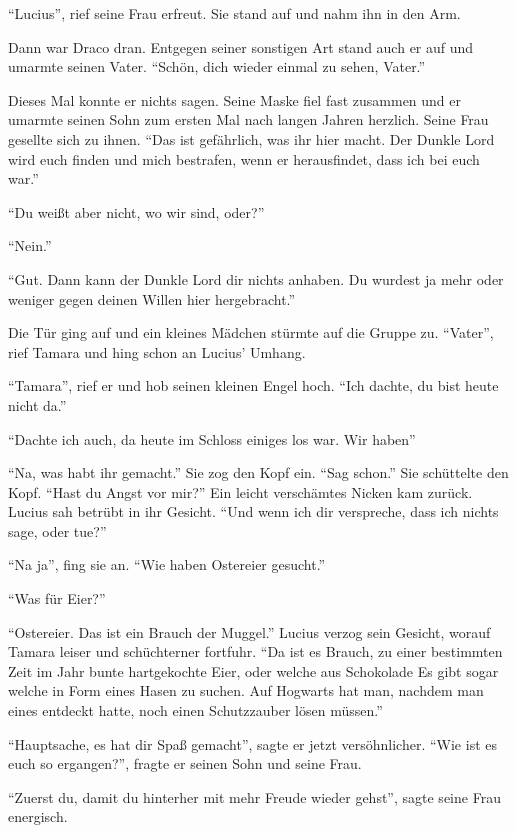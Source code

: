 \enquote{Lucius}, rief seine Frau erfreut. Sie stand auf und nahm ihn in den Arm.

Dann war Draco dran. Entgegen seiner sonstigen Art stand auch er auf und umarmte seinen Vater. \enquote{Schön, dich wieder einmal zu sehen, Vater.}

Dieses Mal konnte er nichts sagen. Seine Maske fiel fast zusammen und er umarmte seinen Sohn zum ersten Mal nach langen Jahren herzlich. Seine Frau gesellte sich zu ihnen. \enquote{Das ist gefährlich, was ihr hier macht. Der Dunkle Lord wird euch finden und mich bestrafen, wenn er herausfindet, dass ich bei euch war.}

\enquote{Du weißt aber nicht, wo wir sind, oder?}

\enquote{Nein.}

\enquote{Gut. Dann kann der Dunkle Lord dir nichts anhaben. Du wurdest ja mehr oder weniger gegen deinen Willen hier hergebracht.}

Die Tür ging auf und ein kleines Mädchen stürmte auf die Gruppe zu. \enquote{Vater}, rief Tamara und hing schon an Lucius’ Umhang.

\enquote{Tamara}, rief er und hob seinen kleinen Engel hoch. \enquote{Ich dachte, du bist heute nicht da.}

\enquote{Dachte ich auch, da heute im Schloss einiges los war. Wir haben\abs}

\enquote{Na, was habt ihr gemacht.} Sie zog den Kopf ein. \enquote{Sag schon.} Sie schüttelte den Kopf. \enquote{Hast du Angst vor mir?} Ein leicht verschämtes Nicken kam zurück. Lucius sah betrübt in ihr Gesicht. \enquote{Und wenn ich dir verspreche, dass ich nichts sage, oder tue?}

\enquote{Na ja}, fing sie an. \enquote{Wie haben Ostereier gesucht.}

\enquote{Was für Eier?}

\enquote{Ostereier. Das ist ein Brauch der Muggel.} Lucius verzog sein Gesicht, worauf Tamara leiser und schüchterner fortfuhr. \enquote{Da ist es Brauch, zu einer bestimmten Zeit im Jahr bunte hartgekochte Eier, oder welche aus Schokolade \gst Es gibt sogar welche in Form eines Hasen \gst zu suchen. Auf Hogwarts hat man, nachdem man eines entdeckt hatte, noch einen Schutzzauber lösen müssen.}

\enquote{Hauptsache, es hat dir Spaß gemacht}, sagte er jetzt versöhnlicher. \enquote{Wie ist es euch so ergangen?}, fragte er seinen Sohn und seine Frau.

\enquote{Zuerst du, damit du hinterher mit mehr Freude wieder gehst}, sagte seine Frau energisch.

